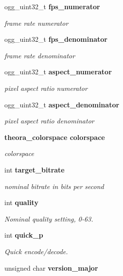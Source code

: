 \begin{CompactItemize}
ogg\_\-uint32\_\-t \bf{fps\_\-numerator}
\begin{CompactList}\small\item\em frame rate numerator \item\end{CompactList}\item 
ogg\_\-uint32\_\-t \bf{fps\_\-denominator}
\begin{CompactList}\small\item\em frame rate denominator \item\end{CompactList}\item 
ogg\_\-uint32\_\-t \bf{aspect\_\-numerator}
\begin{CompactList}\small\item\em pixel aspect ratio numerator \item\end{CompactList}\item 
ogg\_\-uint32\_\-t \bf{aspect\_\-denominator}
\begin{CompactList}\small\item\em pixel aspect ratio denominator \item\end{CompactList}\item 
\bf{theora\_\-colorspace} \bf{colorspace}
\begin{CompactList}\small\item\em colorspace \item\end{CompactList}\item 
int \bf{target\_\-bitrate}
\begin{CompactList}\small\item\em nominal bitrate in bits per second \item\end{CompactList}\item 
int \bf{quality}
\begin{CompactList}\small\item\em Nominal quality setting, 0-63. \item\end{CompactList}\item 
int \bf{quick\_\-p}
\begin{CompactList}\small\item\em Quick encode/decode. \item\end{CompactList}\item 
unsigned char \bf{version\_\-major}

\end{CompactItemize}
